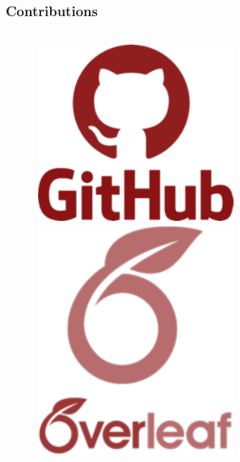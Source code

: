 \documentclass[ignorenonframetext, 8pt, allowframebreaks]{beamer}
\begin{document}
\begin{frame}
 \frametitle{Contributions}
\begin{columns}
		\begin{column}{0.2\textwidth}

 					\begin{figure}
  						  \centering
   						 \includegraphics[width=0.6\textwidth]{../Tex/Pictures/github.pdf}\\
   						 	 \includegraphics[width=0.6\textwidth]{../Tex/Pictures/overleaf.pdf}
				  \end{figure}
		\end{column}
		\begin{column}{0.8\textwidth}
							
		\end{column}
\end{columns}

 \end{frame}
 
 
\end{document}
